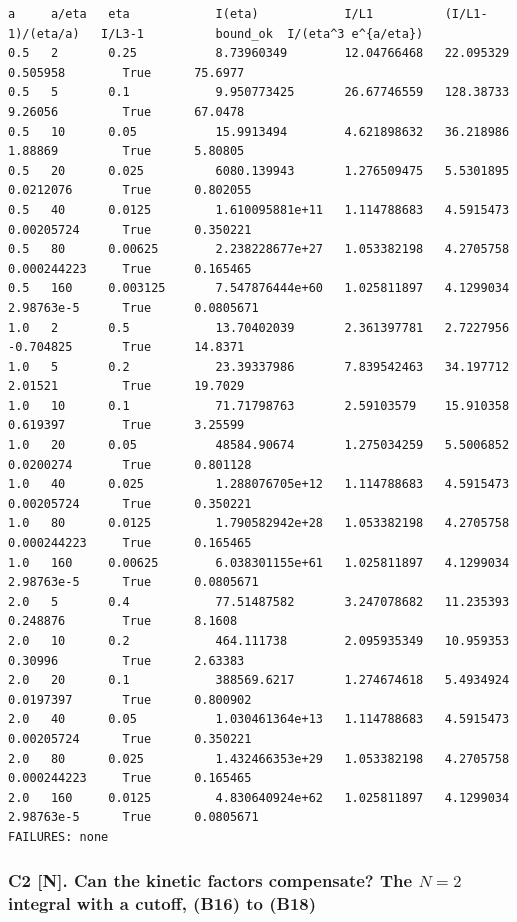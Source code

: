 \documentclass[11pt,a4paper]{article}
\begin{document}
\begin{lstlisting}
a     a/eta   eta            I(eta)            I/L1          (I/L1-1)/(eta/a)   I/L3-1          bound_ok  I/(eta^3 e^{a/eta})
0.5   2       0.25           8.73960349        12.04766468   22.095329          0.505958        True      75.6977
0.5   5       0.1            9.950773425       26.67746559   128.38733          9.26056         True      67.0478
0.5   10      0.05           15.9913494        4.621898632   36.218986          1.88869         True      5.80805
0.5   20      0.025          6080.139943       1.276509475   5.5301895          0.0212076       True      0.802055
0.5   40      0.0125         1.610095881e+11   1.114788683   4.5915473          0.00205724      True      0.350221
0.5   80      0.00625        2.238228677e+27   1.053382198   4.2705758          0.000244223     True      0.165465
0.5   160     0.003125       7.547876444e+60   1.025811897   4.1299034          2.98763e-5      True      0.0805671
1.0   2       0.5            13.70402039       2.361397781   2.7227956          -0.704825       True      14.8371
1.0   5       0.2            23.39337986       7.839542463   34.197712          2.01521         True      19.7029
1.0   10      0.1            71.71798763       2.59103579    15.910358          0.619397        True      3.25599
1.0   20      0.05           48584.90674       1.275034259   5.5006852          0.0200274       True      0.801128
1.0   40      0.025          1.288076705e+12   1.114788683   4.5915473          0.00205724      True      0.350221
1.0   80      0.0125         1.790582942e+28   1.053382198   4.2705758          0.000244223     True      0.165465
1.0   160     0.00625        6.038301155e+61   1.025811897   4.1299034          2.98763e-5      True      0.0805671
2.0   5       0.4            77.51487582       3.247078682   11.235393          0.248876        True      8.1608
2.0   10      0.2            464.111738        2.095935349   10.959353          0.30996         True      2.63383
2.0   20      0.1            388569.6217       1.274674618   5.4934924          0.0197397       True      0.800902
2.0   40      0.05           1.030461364e+13   1.114788683   4.5915473          0.00205724      True      0.350221
2.0   80      0.025          1.432466353e+29   1.053382198   4.2705758          0.000244223     True      0.165465
2.0   160     0.0125         4.830640924e+62   1.025811897   4.1299034          2.98763e-5      True      0.0805671
FAILURES: none
\end{lstlisting}

\hypertarget{c2-n.-can-the-kinetic-factors-compensate-the-n2-integral-with-a-cutoff-b16-to-b18}{%
\subsubsection{\texorpdfstring{C2 {[}N{]}. Can the kinetic factors compensate? The \(N=2\) integral with a cutoff, (B16) to (B18)}{C2 {[}N{]}. Can the kinetic factors compensate? The N=2 integral with a cutoff, (B16) to (B18)}}\label{c2-n.-can-the-kinetic-factors-compensate-the-n2-integral-with-a-cutoff-b16-to-b18}}
\end{document}
